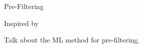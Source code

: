 

\begin{subsection}{Pre-Filtering}

Inspired by 

Talk about the ML method for pre-filtering.



\end{subsection}


